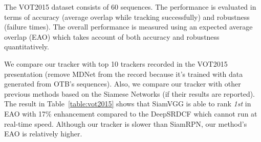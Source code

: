 \documentclass[runningheads]{llncs}
\begin{document}
The VOT2015 dataset consists of 60 sequences. The performance is evaluated in terms of accuracy (average overlap while tracking successfully) and robustness (failure times). The overall performance is measured using an expected average overlap (EAO) which takes account of both accuracy and robustness quantitatively. 

We compare our tracker with top 10 trackers recorded in the VOT2015 presentation (remove MDNet from the record because it's trained with data generated from OTB's sequences). Also, we compare our tracker with other previous methods based on the Siamese Networks (if their results are reported). 
The result in Table~\ref{table:vot2015} shows that SiamVGG is able to rank \textit{1st} in EAO with 17\% enhancement compared to the DeepSRDCF which cannot run at real-time speed. Although our tracker is slower than SiamRPN, our method's EAO is relatively higher.
\end{document}
